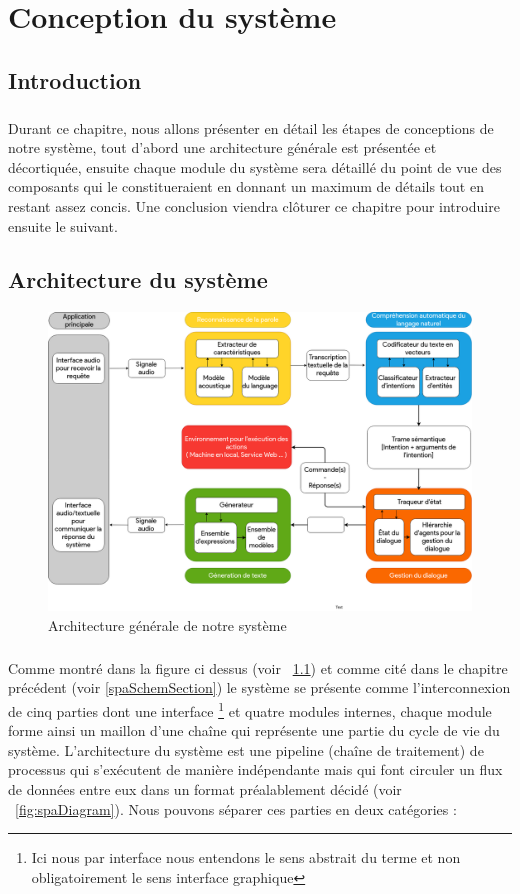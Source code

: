 \chapter{Conception du système}

\section{Introduction}
\paragraph{}
Durant ce chapitre, nous allons présenter en détail les étapes de conceptions de notre système, tout d'abord une architecture générale est présentée et décortiquée, ensuite chaque module du système sera détaillé du point de vue des composants qui le constitueraient en donnant un maximum de détails tout en restant assez concis. Une conclusion viendra clôturer ce chapitre pour introduire ensuite le suivant.
\section{Architecture du système}
\begin{figure}[H]
	\centering
	\includegraphics[width=0.87\linewidth]{images/SPA_architecture.png}
	\caption{Architecture générale de notre système}
	\label{spaArch}
\end{figure}
\paragraph{}
Comme montré dans la figure ci dessus (voir ~\ref{spaArch}) et comme cité dans le chapitre précédent (voir \ref{spaSchemSection}) le système se présente comme l'interconnexion de cinq parties dont une interface \footnote{Ici nous par interface nous entendons le sens abstrait du terme et non obligatoirement le sens interface graphique} et quatre modules internes, chaque module forme ainsi un maillon d'une chaîne qui représente une partie du cycle de vie du système. L'architecture du système est une pipeline (chaîne de traitement) de processus qui s'exécutent de manière indépendante mais qui font circuler un flux de données entre eux dans un format préalablement décidé (voir ~\ref{fig:spaDiagram}). Nous pouvons séparer ces parties en deux catégories :
